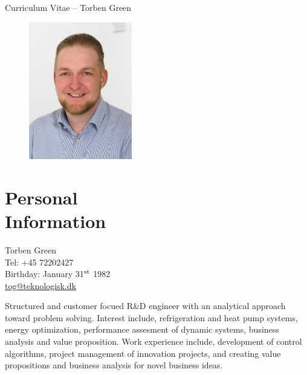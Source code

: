 \documentclass[margin,line,a4paper]{resume}
\begin{document}
{\sc \Large Curriculum Vitae -- Torben Green}
\begin{resume}
    \vspace{0.5cm}
    \begin{figure}
      \vspace{-1cm}
      \begin{center}
        \includegraphics[width=0.4\textwidth]{TOGhrweb}
      \end{center}
      \vspace{-1cm}
    \end{figure}

    \section{\mysidestyle Personal\\Information}%
    Torben Green \\
    Tel: +45 72202427 \\
    Birthday: January 31$^{\rm st}$ 1982\\
    \href{mailto:tog@teknologisk.dk}{tog@teknologisk.dk}

Structured and customer focued R\&D engineer with an analytical approach toward problem solving. Interest include, refrigeration and heat pump systems, energy optimization, performance assesment of dynamic systems, business analysis and value proposition. Work experience include, development of control algorithms, project management of innovation projects, and creating value propositions and business analysis for novel business ideas.


\end{resume}
\end{document}
